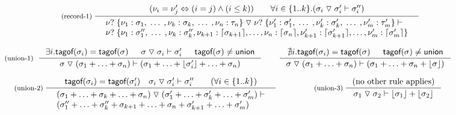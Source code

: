 \documentclass[preprint]{sigplanconf}
\newcommand{\ident}[1]{\textnormal{\sffamily #1}}
\newcommand{\tsep}[0]{\; \triangledown \;}
\newcommand{\dropopt}[1]{\lfloor#1\rfloor}
\newcommand{\addopt}[1]{\lceil#1\rceil}
\newcommand{\tytagof}{\ident{tagof}}
\begin{document}
\begin{figure}[t]
\noindent
\begin{equation*}
\hspace{3em}
\inference[(record-1)\;]
  { (\nu_i = \nu'_j \Leftrightarrow (i = j) \wedge (i \leq k))
      \qquad \forall i\in\{ 1 .. k \}.(\sigma_i \tsep \sigma'_i \vdash \sigma''_i) }
  { \begin{array}{l}
    \nu? \; \{ \nu_1 : \sigma_1,  \; \ldots \;, \nu_k : \sigma_k, \; \ldots \;, \nu_n : \tau_n \} \tsep
    \nu? \; \{ \nu'_1 : \sigma'_1, \; \ldots \;, \nu'_k : \sigma'_k, \; \ldots \;, \nu'_m : \tau'_m \} \vdash\\
    \nu? \; \{ \nu_1 : \sigma''_1, \; \ldots \; , \nu_k : \sigma''_k, 
                            \nu_{k+1} : \addopt{\sigma_{k+1}}, \ldots, \nu_n : \addopt{\sigma_n},
                            \nu'_{k+1} : \addopt{\sigma'_{k+1}}, \ldots, \nu'_m : \addopt{\sigma'_m} \}
    \end{array} }
\end{equation*}

\begin{equation*}
\textnormal{\footnotesize{(union-1)}}\;\;
\inference
  {\exists i . \tytagof(\sigma_i) = \tytagof(\sigma) & \sigma \tsep \sigma_i \vdash \sigma_i' & \tytagof(\sigma)\neq\ident{union}}
  {\sigma \tsep (\sigma_1 + \ldots + \sigma_n) \vdash (\sigma_1 + \ldots + \dropopt{\sigma_i'} + \ldots + \sigma_n)}
\quad\quad
\inference
  {\nexists i . \tytagof(\sigma_i) = \tytagof(\sigma) & \tytagof(\sigma)\neq\ident{union}}
  {\sigma \tsep (\sigma_1 + \ldots + \sigma_n) \vdash (\sigma_1 + \ldots + \sigma_n + \dropopt{\sigma})}
\end{equation*}

\begin{equation*}
\inference[(union-2)\;]
  { \tytagof(\sigma_i) = \tytagof(\sigma'_i) \quad 
    \sigma_i \tsep \sigma_i' \vdash \sigma''_i \qquad (\forall i\in \{ 1 .. k \}) }
  { \begin{array}{l}
    (\sigma_1  + \ldots + \sigma_k +  \ldots + \sigma_n) \tsep 
    (\sigma'_1 + \ldots + \sigma'_k + \ldots + \sigma'_m) \vdash\\
    (\sigma''_1 + \ldots + \sigma''_k + \sigma_{k+1} + \ldots + \sigma_{n} + \sigma'_{k+1} + \ldots + \sigma'_{m}) 
    \end{array} }
%
\qquad\quad
\inference[(union-3)\;]
  {(\textnormal{no other rule applies})}
  {\sigma_1 \tsep \sigma_2 \vdash \dropopt{\sigma_1} + \dropopt{\sigma_2}}
\end{equation*}


\end{figure}
\end{document}
